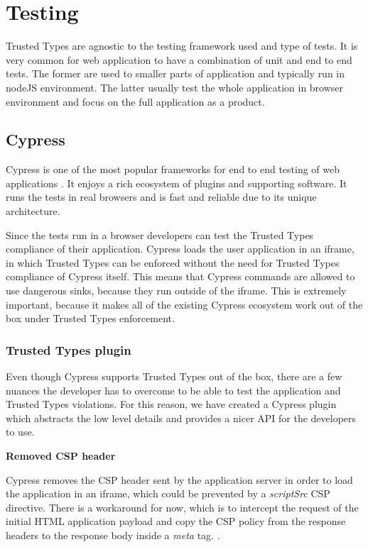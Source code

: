 \chapter{Testing}


Trusted Types are agnostic to the testing framework used and type of tests. It is very common for
web application to have a combination of unit and end to end tests. The former are used to smaller
parts of application and typically run in nodeJS environment. The latter usually test the whole
application in browser environment and focus on the full application as a product.

\section{Cypress}

Cypress is one of the most popular frameworks for end to end testing of web applications
\cite{js_state:testing}. It enjoys a rich ecosystem of plugins and supporting software. It runs the
tests in real browsers and is fast and reliable due to its unique architecture.

Since the tests run in a browser developers can test the Trusted Types compliance of their
application. Cypress loads the user application in an iframe, in which Trusted Types can be enforced
without the need for Trusted Types compliance of Cypress itself. This means that Cypress commands
are allowed to use dangerous sinks, because they run outside of the iframe. This is extremely
important, because it makes all of the existing Cypress ecosystem work out of the box under Trusted
Types enforcement.

\subsection{Trusted Types plugin}

Even though Cypress supports Trusted Types out of the box, there are a few nuances the developer has
to overcome to be able to test the application and Trusted Types violations. For this reason, we
have created a Cypress plugin which abstracts the low level details and provides a nicer API for the
developers to use.

\begin{flushleft}\textbf {Removed CSP header}\end{flushleft}

Cypress removes the CSP header sent by the application server in order to load the application in an
iframe, which could be prevented by a \textit{scriptSrc} CSP directive. There is a workaround for
now, which is to intercept the request of the initial HTML application payload and copy the CSP
policy from the response headers to the response body inside a \textit{meta} tag.
\cite{cypress:csp_removal_issue}.

